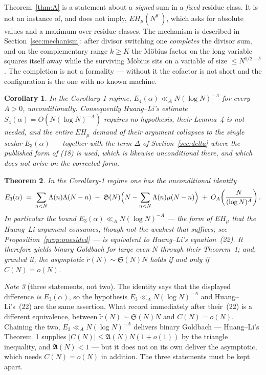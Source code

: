 \documentclass[11pt,a4paper]{article}
\theoremstyle{plain}
\newtheorem{theorem}{Theorem}
\newtheorem{corollary}[theorem]{Corollary}
\theoremstyle{definition}
\theoremstyle{remark}
\newtheorem{note}[theorem]{Note}
\renewcommand{\SS}{\mathfrak{S}}
\newcommand{\AAA}{\mathfrak{A}}
\begin{document}
Theorem~\ref{thm:A} is a statement about a \emph{signed} sum in a
\emph{fixed} residue class. It is not an instance of, and does not
imply, $EH_\mu(N^{\theta'})$, which asks for absolute values and a
maximum over residue classes. The mechanism is described in
Section~\ref{sec:mechanism}: after divisor switching one
\emph{completes} the divisor sum, and on the complementary range
$k\ge K$ the M\"obius factor on the long variable squares itself away
while the surviving M\"obius sits on a variable of size
$\le N^{1/2-\delta}$. The completion is not a formality --- without it
the cofactor is not short and the configuration is the one with no
known machine.

\begin{corollary}\label{cor:B}
In the Corollary-1 regime, $E_4(\alpha)\ll_A N(\log N)^{-A}$ for every
$A>0$, unconditionally. Consequently Huang--Li's estimate
$S_4(\alpha)=O(N(\log N)^{-A})$ requires no hypothesis, their Lemma~4
is not needed, and the entire $EH_\mu$ demand of their argument
collapses to the single scalar $E_3(\alpha)$ --- together with the
term $\Delta$ of Section~\ref{sec:delta} where the published form of
(18) is used, which is likewise unconditional there, and which does not
arise on the corrected form.
\end{corollary}

\begin{theorem}\label{thm:C}
In the Corollary-1 regime one has the unconditional identity
\[
  E_3(\alpha)\;=\;\sum_{n<N}\Lambda(n)\Lambda(N-n)
     \;-\;\SS(N)\Bigl(N-\sum_{n<N}\Lambda(n)\mu(N-n)\Bigr)
     \;+\;O_A\!\left(\frac{N}{(\log N)^{A}}\right).
\]
In particular the bound $E_3(\alpha)\ll_A N(\log N)^{-A}$ --- the form
of $EH_\mu$ that the Huang--Li argument consumes, though not the
weakest that suffices; see Proposition~\ref{prop:onesided} --- is
\emph{equivalent} to Huang--Li's equation~(22). It therefore yields
binary Goldbach for large even $N$ through their Theorem~1; and,
granted it, the asymptotic $\tilde r(N)\sim\SS(N)N$ holds if and only
if $C(N)=o(N)$.
\end{theorem}

\begin{note}[three statements, not two]\label{note:threeway}
The identity says that the displayed difference \emph{is}
$E_3(\alpha)$, so the hypothesis $E_3\ll_A N(\log N)^{-A}$ and
Huang--Li's~(22) are the same assertion. What \cite{HL} record
immediately after their~(22) is a different equivalence, between
$\tilde r(N)\sim\SS(N)N$ and $C(N)=o(N)$. Chaining the two,
$E_3\ll_A N(\log N)^{-A}$ delivers binary Goldbach --- Huang--Li's
Theorem~1 supplies $|C(N)|\le\AAA(N)N(1+o(1))$ by the triangle
inequality, and $\AAA(N)<1$ --- but it does not on its own deliver the
asymptotic, which needs $C(N)=o(N)$ in addition. The three statements
must be kept apart.
\end{note}
\end{document}
